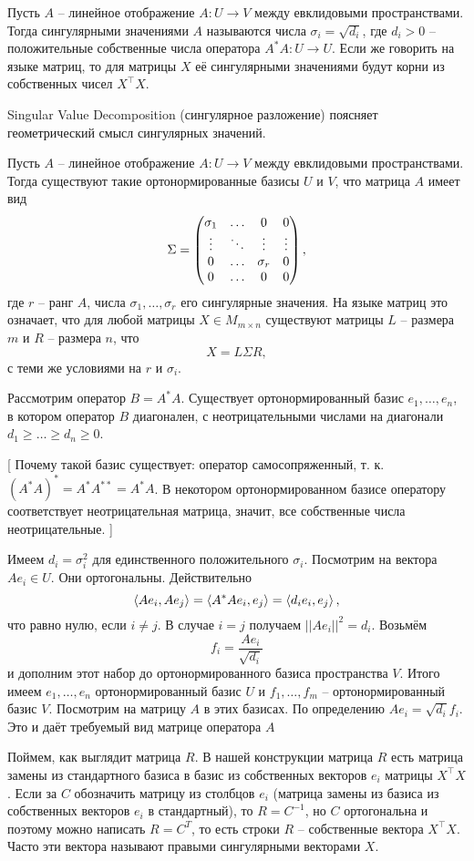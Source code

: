  Пусть $A$ -- линейное отображение $A\colon U \to V$ между евклидовыми пространствами. Тогда сингулярными значениями $A$ называются числа $\sigma_i=\sqrt{d_i}$, где $d_i>0$ -- положительные собственные числа оператора $A^*A \colon U \to U$. Если же говорить на языке матриц, то для матрицы $X$ её сингулярными значениями будут корни из собственных чисел $X^{\top}X$. 
\edfn

Singular Value Decomposition (сингулярное разложение) поясняет геометрический смысл сингулярных значений.

 Пусть $A$ -- линейное отображение $A\colon U \to V$ между евклидовыми пространствами. Тогда существуют такие ортонормированные базисы $U$ и $V$, что матрица $A$ имеет вид 
$$\Sigma = \begin{pmatrix} \sigma_1 &\dots& 0 & 0\\
 \vdots & \ddots &\vdots & \vdots\\
 0 & \dots & \sigma_r & 0\\
 0 &  \dots & 0 & 0 \end{pmatrix},$$
 где $r$ -- ранг $A$, числа $\sigma_1, \dots, \sigma_r$ его сингулярные значения.
На языке матриц это означает, что для любой матрицы $X \in M_{m\times n}$ существуют матрицы $L$ -- размера $m$ и $R$ -- размера $n$,  что
$$X= L \Sigma R,$$
 с теми же условиями на $r$ и $\sigma_i$.
 
\proof Рассмотрим оператор $B = A^{*}A$. Существует ортонормированный базис $e_1,\dots,e_n$, в котором оператор $B$ диагонален, с неотрицательными числами на диагонали $d_1\geq\dots\geq d_n\geq 0$. 

[ Почему такой базис существует: оператор самосопряженный, т. к. $(A^*A)^* = A^*A^{**} = A^*A$. В некотором ортонормированном базисе оператору соответствует неотрицательная матрица, значит, все собственные числа неотрицательные. ]

Имеем  $d_i=\sigma_i^2$ для единственного положительного $\sigma_i$. 
Посмотрим на вектора $Ae_i \in U$. Они ортогональны. Действительно
$$\left\langle Ae_i, Ae_j\right\rangle = \left\langle A^{*}Ae_i,e_j \right\rangle = \left\langle d_i e_i,e_j\right\rangle,$$
что равно нулю, если $i\neq j$. В случае $i=j$ получаем $||Ae_i||^2=d_i$. Возьмём 
$$f_i=\frac{Ae_i}{\sqrt{d_i}}$$
и дополним этот набор до ортонормированного базиса пространства $V$. Итого имеем $e_1,\dots,e_n$ ортонормированный базис $U$ и $f_1,\dots,f_m$ -- ортонормированный базис $V$.
Посмотрим на матрицу $A$ в этих базисах. По определению $Ae_i=\sqrt{d_i}f_i$. Это и даёт требуемый вид матрице оператора $A$

Поймем, как выглядит матрица $R$. В нашей конструкции матрица $R$ есть матрица замены из стандартного базиса в базис из собственных векторов $e_i$ матрицы $X^{\top}X$. Если за $C$ обозначить матрицу из столбцов $e_i$ (матрица замены из базиса из собственных векторов $e_i$ в стандартный), то $R=C^{-1}$, но $C$ ортогональна и поэтому можно написать $R=C^{T}$, то есть строки $R$ -- собственные вектора $X^{\top}X$. Часто эти вектора называют правыми сингулярными векторами $X$.

